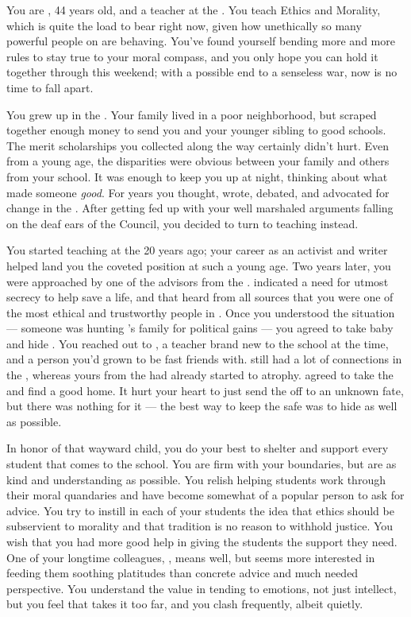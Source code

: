 \documentclass[char]{GL2020}
\begin{document}
\name{\cEthics{}}

You are \cEthics{\intro}, 44 years old, and a teacher at the \pSchool{}. You teach Ethics and Morality, which is quite the load to bear right now, given how unethically so many powerful people on \pEarth{} are behaving. You've found yourself bending more and more rules to stay true to your moral compass, and you only hope you can hold it together through this weekend; with a possible end to a senseless war, now is no time to fall apart.

You grew up in the \pTech{}. Your family lived in a poor neighborhood, but scraped together enough money to send you and your younger sibling to good schools. The merit scholarships you collected along the way certainly didn't hurt. Even from a young age, the disparities were obvious between your family and others from your school. It was enough to keep you up at night, thinking about what made someone \emph{good}. For years you thought, wrote, debated, and advocated for change in the \pTech{}. After getting fed up with your well marshaled arguments falling on the deaf ears of the Council, you decided to turn to teaching instead.

You started teaching at the \pSc{} 20 years ago; your career as an activist and writer helped land you the coveted position at such a young age. Two years later, you were approached by one of the advisors from the \pFarm{}. \cEvil{\They} indicated a need for utmost secrecy to help save a life, and that \cEvil{\they} heard from all sources that you were one of the most ethical and trustworthy people in \pEarth{}. Once you understood the situation — someone was hunting \cEvil{\full}'s family for political gains — you agreed to take \cEvil{\their} baby \cPirateChild{\child} and hide \cPirateChild{\them}. You reached out to \cPirate{\full}, a teacher brand new to the school at the time, and a person you'd grown to be fast friends with. \cPirate{\They} still had a lot of connections in the \pShip{}, whereas yours from the \pTech{} had already started to atrophy. \cPirate{} agreed to take the \cPirateChild{\child} and find \cPirateChild{\them} a good home. It hurt your heart to just send the \cPirateChild{\child} off to an unknown fate, but there was nothing for it — the best way to keep the \cPirateChild{\child} safe was to hide \cPirateChild{\them} as well as possible.

In honor of that wayward child, you do your best to shelter and support every student that comes to the school. You are firm with your boundaries, but are as kind and understanding as possible. You relish helping students work through their moral quandaries and have become somewhat of a popular person to ask for advice. You try to instill in each of your students the idea that ethics should be subservient to morality and that tradition is no reason to withhold justice. You wish that you had more good help in giving the students the support they need. One of your longtime colleagues, \cMusic{\full}, means well, but seems more interested in feeding them soothing platitudes than concrete advice and much needed perspective. You understand the value in tending to emotions, not just intellect, but you feel that \cMusic{} takes it too far, and you clash frequently, albeit quietly.
\end{document}
